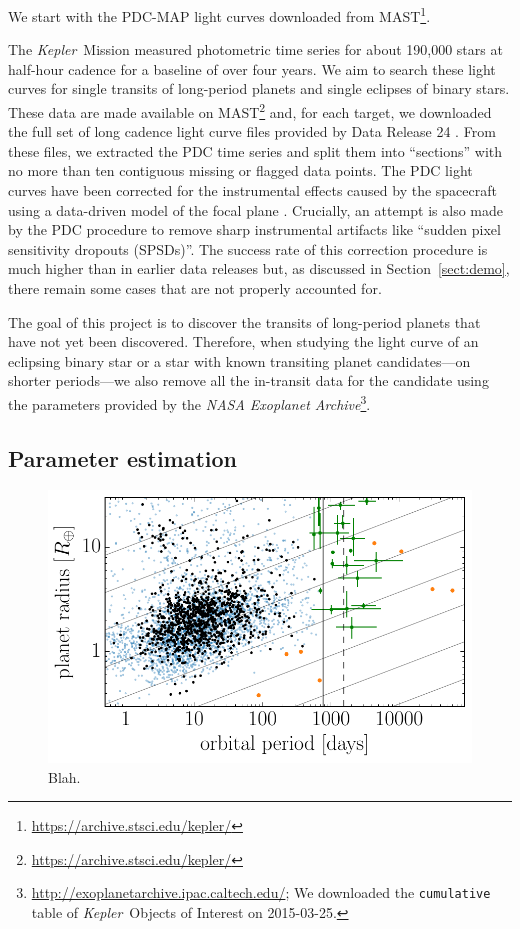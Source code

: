 \documentclass[twocolumn]{aastex6}
\newcommand{\project}[1]{\textsl{#1}}
\newcommand{\kepler}{\project{Kepler}}
\newcommand{\figlabel}[1]{\label{fig:#1}}
\newcommand{\sectionname}{Section}
\newcommand{\sectref}[1]{\ref{sect:#1}}
\newcommand{\Sect}[1]{\sectionname~\sectref{#1}}
\newcommand{\sect}[1]{\Sect{#1}}
\begin{document}
We start with the PDC-MAP light curves downloaded from
MAST\footnote{\url{https://archive.stsci.edu/kepler/}}.



The \kepler\ Mission measured photometric time series for about 190,000 stars
at half-hour cadence for a baseline of over four years.
We aim to search these light curves for single transits of long-period planets
and single eclipses of binary stars.
These data are made available on
MAST\footnote{\url{https://archive.stsci.edu/kepler/}} and, for each target,
we downloaded the full set of long cadence light curve files provided by Data
Release 24 \citep{Thompson:2015}.
From these files, we extracted the PDC time series and split them into
``sections'' with no more than ten contiguous missing or flagged data points.
The PDC light curves have been corrected for the instrumental effects caused
by the spacecraft using a data-driven model of the focal plane
\citep{Stumpe:2012, Smith:2012}.
Crucially, an attempt is also made by the PDC procedure to remove sharp
instrumental artifacts like ``sudden pixel sensitivity dropouts (SPSDs)''.
The success rate of this correction procedure is much higher than in earlier
data releases but, as discussed in \sect{demo}, there remain some cases that
are not properly accounted for.

The goal of this project is to discover the transits of long-period planets
that have not yet been discovered.
Therefore, when studying the light curve of an eclipsing binary star or a star
with known transiting planet candidates---on shorter periods---we also remove
all the in-transit data for the candidate using the parameters provided by the
\project{NASA Exoplanet
Archive}\footnote{\url{http://exoplanetarchive.ipac.caltech.edu/}; We
downloaded the \texttt{cumulative} table of \kepler\ Objects of Interest on
2015-03-25.}.


\subsection{Parameter estimation}


\begin{figure}
\begin{center}
\includegraphics{figures/full_sample.pdf}
\end{center}
\caption{%
Blah.
\figlabel{full-sample}}
\end{figure}
\end{document}

